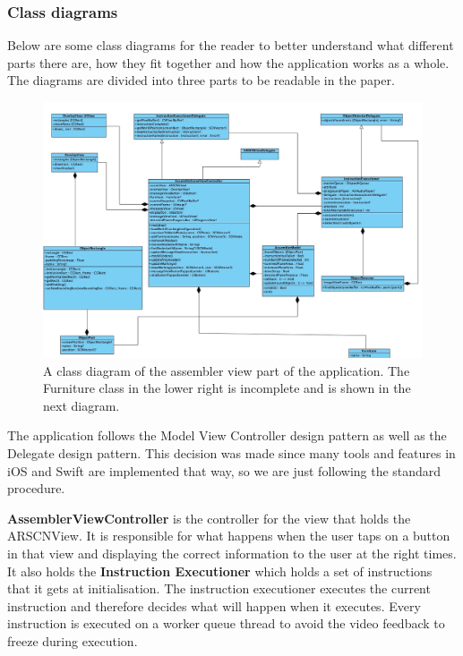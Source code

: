\subsubsection{Class diagrams}
Below are some class diagrams for the reader to better understand what different parts there are, 
how they fit together and how the application works as a whole. The diagrams are divided into 
three parts to be readable in the paper.

\begin{figure}[!hbtp]
\begin{center}
\includegraphics[width = 1.1\textwidth]{./Images/AssemblerClassDiagram1.jpg}
\caption{A class diagram of the assembler view part of the application. The Furniture class in the lower right is incomplete and is shown in the next diagram.}
\label{fig:classdiagramassembler}
\end{center}
\end{figure}

The application follows the Model View Controller design pattern as well as the Delegate design pattern.
This decision was made since many tools and features in iOS and Swift are implemented that way,
so we are just following the standard procedure.

\textbf{AssemblerViewController} is the controller for the view that holds the ARSCNView.
It is responsible for what happens when the user taps on a button in that view and displaying the correct
information to the user at the right times. It also holds the \textbf{Instruction Executioner} which holds a 
set of instructions that it gets at initialisation. The instruction executioner executes the current
instruction and therefore decides what will happen when it executes. Every instruction is executed on a worker queue thread to avoid the video feedback to freeze during execution.\\

